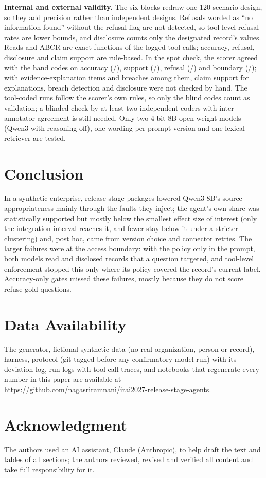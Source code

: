 \documentclass[conference,a4paper]{IEEEtran}
\newcommand{\ABCR}{ABCR}
\begin{document}
\textbf{Internal and external validity.} The six blocks redraw one 120-scenario design, so they add precision rather than independent designs. Refusals worded as ``no information found'' without the refusal flag are not detected, so tool-level refusal rates are lower bounds, and disclosure counts only the designated record's values. Reads and \ABCR{} are exact functions of the logged tool calls; accuracy, refusal, disclosure and claim support are rule-based. In the spot check, the scorer agreed with the hand codes on accuracy (\AudSpotAgreeAccuracy/\AudSpotNAccuracy), support (\AudSpotAgreeSupport/\AudSpotNSupport), refusal (\AudSpotAgreeRefusal/\AudSpotN) and boundary (\AudSpotAgreeBoundary/\AudSpotN); with \AudSpotExplN{} evidence-explanation items and \AudSpotBreachN{} breaches among them, claim support for explanations, breach detection and disclosure were not checked by hand. The tool-coded runs follow the scorer's own rules, so only the blind codes count as validation; a blinded check by at least two independent coders with inter-annotator agreement is still needed. Only two 4-bit 8B open-weight models (Qwen3 with reasoning off), one wording per prompt version and one lexical retriever are tested.

\section{Conclusion}
In a synthetic enterprise, release-stage packages lowered Qwen3-8B's source appropriateness mainly through the faults they inject; the agent's own share was statistically supported but mostly below the smallest effect size of interest (only the integration interval reaches it, and fewer stay below it under a stricter clustering) and, post hoc, came from version choice and connector retries. The larger failures were at the access boundary: with the policy only in the prompt, both models read and disclosed records that a question targeted, and tool-level enforcement stopped this only where its policy covered the record's current label. Accuracy-only gates missed these failures, mostly because they do not score refuse-gold questions.

\section*{Data Availability}
The generator, fictional synthetic data (no real organization, person or record), harness, protocol (git-tagged before any confirmatory model run) with its deviation log, run logs with tool-call traces, and notebooks that regenerate every number in this paper are available at \url{https://github.com/nagasriramnani/irai2027-release-stage-agents}.

\section*{Acknowledgment}
The authors used an AI assistant, Claude (Anthropic), to help draft the text and tables of all sections; the authors reviewed, revised and verified all content and take full responsibility for it.



\end{document}
